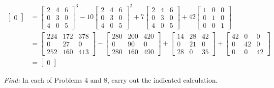 \documentclass[11pt]{homework}
\begin{document}
\begin{align*}
\begin{bmatrix}
  0
\end{bmatrix}
&=
  \begin{bmatrix}
    2 & 4 & 6 \\
    0 & 3 & 0 \\
    4 & 0 & 5
  \end{bmatrix} ^3
  - 10
  \begin{bmatrix}
    2 & 4 & 6 \\
    0 & 3 & 0 \\
    4 & 0 & 5
  \end{bmatrix}^2
  +7
  \begin{bmatrix}
    2 & 4 & 6 \\
    0 & 3 & 0 \\
    4 & 0 & 5
  \end{bmatrix}
  +42
  \begin{bmatrix}
    1 & 0 & 0 \\
    0 & 1 & 0 \\
    0 & 0 & 1
  \end{bmatrix} \\
&=
  \begin{bmatrix}
    224 & 172 & 378 \\
    0 & 27 & 0 \\
    252 & 160 & 413
  \end{bmatrix}
  -
  \begin{bmatrix}
  280 & 200 & 420 \\
  0 & 90 & 0 \\
  280 & 160 & 490 
  \end{bmatrix}
  +
  \begin{bmatrix}
  14 & 28 & 42 \\
  0 & 21 & 0 \\
  28 & 0 & 35
  \end{bmatrix}
  +
  \begin{bmatrix}
  42 & 0 & 0 \\
  0 & 42 & 0 \\
  0 & 0 & 42
  \end{bmatrix} \\
&= 
  \begin{bmatrix}
  0
  \end{bmatrix}
\end{align*}


\newpage
{}
\emph{Find:}
\newline
In each of Problems 4 and 8, 
carry out the indicated calculation.
\end{document}
